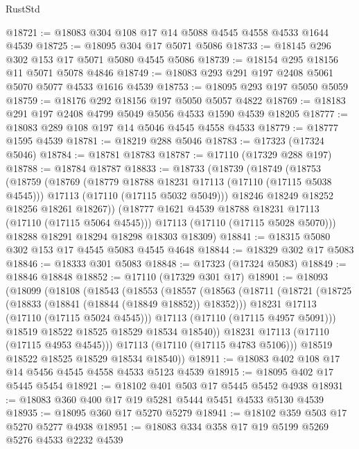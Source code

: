 \begin{lexlean}{RustStd}
\begin{coremodule}
@18721 := @18083 @304 @108 @17 @14 @5088 @4545 @4558 @4533 @1644 @4539
@18725 := @18095 @304 @17 @5071 @5086
@18733 := @18145 @296 @302 @153 @17 @5071 @5080 @4545 @5086
@18739 := @18154 @295 @18156 @11 @5071 @5078 @4846
@18749 := @18083 @293 @291 @197 @2408 @5061 @5070 @5077 @4533 @1616 @4539
@18753 := @18095 @293 @197 @5050 @5059
@18759 := @18176 @292 @18156 @197 @5050 @5057 @4822
@18769 := @18183 @291 @197 @2408 @4799 @5049 @5056 @4533 @1590 @4539 @18205
@18777 := @18083 @289 @108 @197 @14 @5046 @4545 @4558 @4533
@18779 := @18777 @1595 @4539
@18781 := @18219 @288 @5046
@18783 := @17323 (@17324 @5046)
@18784 := @18781 @18783
@18787 := @17110 (@17329 @288 @197)
@18788 := @18784 @18787
@18833 := @18733
    (@18739
      (@18749
        (@18753
          (@18759
            (@18769
              (@18779 @18788 @18231 @17113 (@17110 (@17115 @5038 @4545)))
              @17113
              (@17110 (@17115 @5032 @5049)))
            @18246
            @18249
            @18252
            @18256
            @18261
            @18267))
        (@18777 @1621 @4539 @18788 @18231 @17113 (@17110 (@17115 @5064 @4545)))
        @17113
        (@17110 (@17115 @5028 @5070)))
      @18288
      @18291
      @18294
      @18298
      @18303
      @18309)
@18841 := @18315 @5080 @302 @153 @17 @4545 @5083 @4545 @4648
@18844 := @18329 @302 @17 @5083
@18846 := @18333 @301 @5083
@18848 := @17323 (@17324 @5083)
@18849 := @18846 @18848
@18852 := @17110 (@17329 @301 @17)
@18901 := @18093
    (@18099
      (@18108
        (@18543
          (@18553
            (@18557
              (@18563
                (@18711
                  (@18721
                    (@18725 (@18833 (@18841 (@18844 (@18849 @18852)) @18352)))
                    @18231
                    @17113
                    (@17110 (@17115 @5024 @4545)))
                  @17113
                  (@17110 (@17115 @4957 @5091)))
                @18519
                @18522
                @18525
                @18529
                @18534
                @18540))
            @18231
            @17113
            (@17110 (@17115 @4953 @4545)))
          @17113
          (@17110 (@17115 @4783 @5106)))
        @18519
        @18522
        @18525
        @18529
        @18534
        @18540))
@18911 := @18083 @402 @108 @17 @14 @5456 @4545 @4558 @4533 @5123 @4539
@18915 := @18095 @402 @17 @5445 @5454
@18921 := @18102 @401 @503 @17 @5445 @5452 @4938
@18931 := @18083 @360 @400 @17 @19 @5281 @5444 @5451 @4533 @5130 @4539
@18935 := @18095 @360 @17 @5270 @5279
@18941 := @18102 @359 @503 @17 @5270 @5277 @4938
@18951 := @18083 @334 @358 @17 @19 @5199 @5269 @5276 @4533 @2232 @4539

\end{coremodule}
\end{lexlean}
